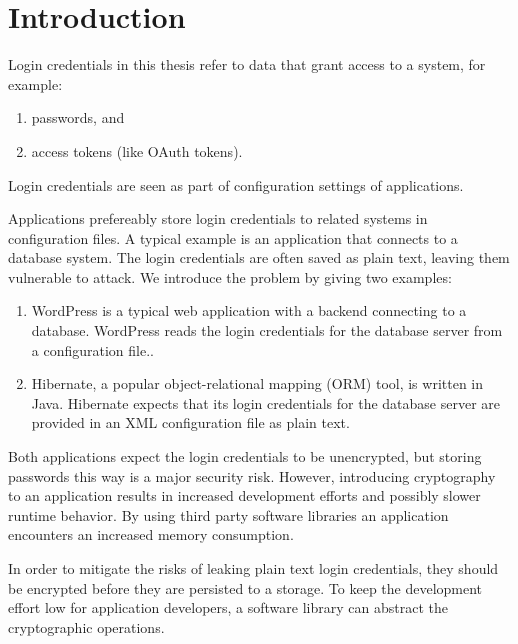\chapter{Introduction}
\label{intro}

Login credentials in this thesis refer to data that grant access to a system, for example:

\begin{enumerate}
\item passwords, and
\item access tokens (like OAuth tokens\cite{rfc6749}).
\end{enumerate}

Login credentials are seen as part of configuration settings of applications.

Applications prefereably store login credentials to related systems in configuration files.
A typical example is an application that connects to a database system.
The login credentials are often saved as plain text, leaving them vulnerable to attack.
We introduce the problem by giving two examples:

\begin{enumerate}
\item WordPress is a typical web application with a backend connecting to a database.
WordPress reads the login credentials for the database server from a configuration file.\cite{wordpress-doc}.
\item Hibernate, a popular object-relational mapping (ORM) tool, is written in Java.
Hibernate expects that its login credentials for the database server are provided in an XML configuration file as plain text.\cite{hibernate-doc}
\end{enumerate}

Both applications expect the login credentials to be unencrypted, but storing passwords this way is a major security risk.
However, introducing cryptography to an application results in increased development efforts and possibly slower runtime behavior.
By using third party software libraries an application encounters an increased memory consumption.

\label{intro-hypo-one}

\label{intro-hypo-two}

In order to mitigate the risks of leaking plain text login credentials, they should be encrypted before they are persisted to a storage.
To keep the development effort low for application developers, a software library can abstract the cryptographic operations.

